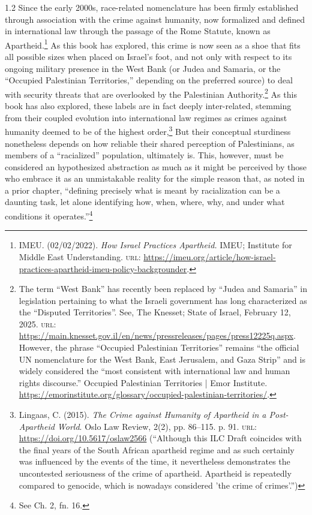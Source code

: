 \documentclass[../unravbook.tex]{subfiles}
\begin{document}
\begin{spacing}{1.2}
Since the early 2000s, race-related nomenclature has been firmly established through association with the crime against humanity, now formalized and defined in international law through the passage of the Rome Statute, known as Apartheid.\footnote{IMEU. (02/02/2022). \textit{How Israel Practices Apartheid.} IMEU; Institute for Middle East Understanding. \textsc{url:} \url{https://imeu.org/article/how-israel-practices-apartheid-imeu-policy-backgrounder}.} As this book has explored, this crime is now seen as a shoe that fits all possible sizes when placed on Israel's foot, and not only with respect to its ongoing military presence in the West Bank (or Judea and Samaria, or the ``Occupied Palestinian Territories,'' depending on the preferred source) to deal with security threats that are overlooked by the Palestinian Authority.\footnote{The term ``West Bank'' has recently been replaced by ``Judea and Samaria'' in legislation pertaining to what the Israeli government has long characterized as the \enquote{Disputed Territories}. See, The Knesset; State of Israel, February 12, 2025. \textsc{url:} \url{https://main.knesset.gov.il/en/news/pressreleases/pages/press12225q.aspx}. However, the phrase ``Occupied Palestinian Territories'' remains ``the official UN nomenclature for the West Bank, East Jerusalem, and Gaza Strip'' and is widely considered the \enquote{most consistent with international law and human rights discourse.} Occupied Palestinian Territories | Emor Institute. \url{https://emorinstitute.org/glossary/occupied-palestinian-territories/}.} As this book has also explored, these labels are in fact deeply inter-related, stemming from their coupled evolution into international law regimes as crimes against humanity deemed to be of the highest order,\footnote{Lingaas, C. (2015). \textit{The Crime against Humanity of Apartheid in a Post-Apartheid World}. Oslo Law Review, 2(2), pp. 86--115. p. 91. \textsc{url: } \url{https://doi.org/10.5617/oslaw2566} (``Although this ILC Draft coincides with the final years of the South African apartheid regime and as such certainly was influenced by the events of the time, it nevertheless demonstrates the uncontested seriousness of the crime of apartheid. Apartheid is repeatedly compared to genocide, which is nowadays considered 'the crime of crimes'.'')} But their conceptual sturdiness nonetheless depends on how reliable their shared perception of Palestinians, as members of a ``racialized'' population, ultimately is. This, however, must be considered an hypothesized abstraction as much as it might be perceived by those who embrace it as an unmistakable reality for the simple reason that, as noted in a prior chapter, ``defining precisely what is meant by racialization can be a daunting task, let alone identifying how, when, where, why, and under what conditions it operates.''\footnote{See Ch. 2, fn. 16.} 


\end{spacing}
\end{document}
